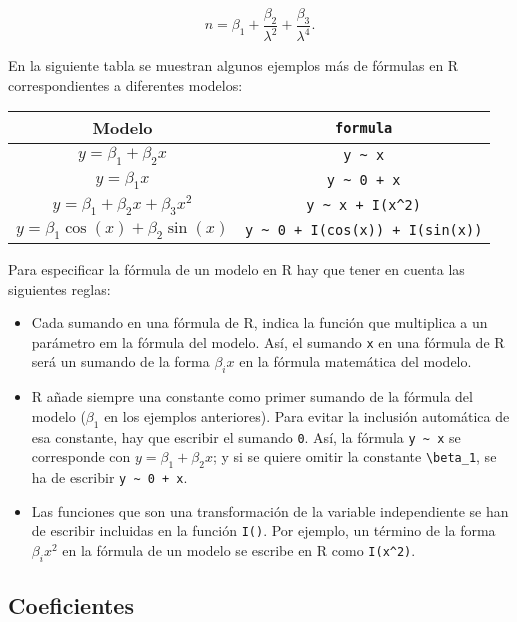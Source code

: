 \documentclass[
  degree=mecinf,
  title=normal,
  toc=normal,
  bib=normal]{mnye}
\begin{document}
\[n = \beta_1 + \frac{\beta_2}{\lambda^2} + \frac{\beta_3}{\lambda^4}.\]

En la siguiente tabla se muestran algunos ejemplos más de fórmulas en \textsf{R} correspondientes a diferentes modelos:

\begin{longtable}[]{@{}cc@{}}
\toprule
Modelo & \texttt{formula} \\
\midrule
\endhead
\(y=\beta_1+\beta_2x\) & \texttt{y\ \textasciitilde{}\ x} \\
\(y=\beta_1 x\) & \texttt{y\ \textasciitilde{}\ 0\ +\ x} \\
\(y=\beta_1 + \beta_2 x + \beta_3 x^2\) & \texttt{y\ \textasciitilde{}\ x\ +\ I(x\^{}2)} \\
\(y=\beta_1 \cos(x)+ \beta_2\sin(x)\) & \texttt{y\ \textasciitilde{}\ 0\ +\ I(cos(x))\ +\ I(sin(x))} \\
\bottomrule
\end{longtable}

Para especificar la fórmula de un modelo en \textsf{R} hay que tener en cuenta las siguientes reglas:

\begin{itemize}
\item
  Cada sumando en una fórmula de \textsf{R}, indica la función que multiplica a un parámetro em la fórmula del modelo. Así, el sumando \texttt{x} en una fórmula de \textsf{R} será un sumando de la forma \(\beta_ix\) en la fórmula matemática del modelo.
\item
  \textsf{R} añade siempre una constante como primer sumando de la fórmula del modelo (\(\beta_1\) en los ejemplos anteriores). Para evitar la inclusión automática de esa constante, hay que escribir el sumando \texttt{0}. Así, la fórmula \texttt{y\ \textasciitilde{}\ x} se corresponde con \(y = \beta_1 + \beta_2x\); y si se quiere omitir la constante \texttt{\textbackslash{}beta\_1}, se ha de escribir \texttt{y\ \textasciitilde{}\ 0\ +\ x}.
\item
  Las funciones que son una transformación de la variable independiente se han de escribir incluidas en la función \texttt{I()}. Por ejemplo, un término de la forma \(\beta_i x^2\) en la fórmula de un modelo se escribe en \textsf{R} como \texttt{I(x\^{}2)}.
\end{itemize}

\hypertarget{coeficientes}{%
\subsection{Coeficientes}\label{coeficientes}}
\end{document}
